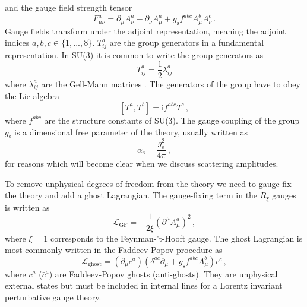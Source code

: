\documentclass[main.tex]{subfiles}
\begin{document}
    and the gauge field strength tensor
    \begin{equation}\label{eqn:F_munu}
        F^{a}_{\mu\nu} = \partial_{\mu}A^{a}_{\nu} - \partial_{\nu}A^{a}_{\mu} + g_{\mathrm{s}} f^{abc}A^{b}_{\mu}A^{c}_{\nu} \, .
    \end{equation}
    Gauge fields transform under the adjoint representation, meaning
    the adjoint indices $a,b,c \in \{1,...,8\}$. $T^{a}_{ij}$ are the
    group generators in a fundamental representation. In SU(3) it is
    common to write the group generators as
    \begin{equation}\label{eqn:group_generators}
        T^{a}_{ij} = \dfrac{1}{2}\lambda^{a}_{ij}
    \end{equation}
    where $\lambda^{a}_{ij}$ are the Gell-Mann matrices \cite{Gell-Mann:1962yej}.
    The generators of the group have to obey the Lie algebra
    \begin{equation}\label{eqn:lie_algebra}
        [T^{a}, T^{b}] = \mathrm{i}f^{abc}T^{c} \, ,
    \end{equation}
    where $f^{abc}$ are the structure constants of SU(3).
    The gauge coupling of the group $g_{\mathrm{s}}$
    is a dimensional free parameter of the theory, usually
    written as
    \begin{equation}\label{eqn:alpha_s}
        \alpha_{\mathrm{s}} = \dfrac{g_{\mathrm{s}}^{2}}{4\pi} \, ,
    \end{equation}
    for reasons which will become clear when we discuss
    scattering amplitudes.

    To remove unphysical degrees of freedom from the
    theory we need to gauge-fix the theory
    and add a ghost Lagrangian. The gauge-fixing term
    in the $R_{\xi}$ gauges is written as
    \begin{equation}\label{eqn:L_GF}
        \mathcal{L}_{\mathrm{GF}} = -\dfrac{1}{2\xi}(\partial^{\mu}A_{\mu}^{a})^{2} \, ,
    \end{equation}
    where $\xi = 1$ corresponds to the Feynman-'t-Hooft gauge.
    The ghost Lagrangian is most commonly written
    in the Faddeev-Popov procedure as
    \begin{equation}\label{eqn:L_ghost}
        \mathcal{L}_{\mathrm{ghost}} = (\partial_{\mu}\bar{c}^{a})(\delta^{ac}\partial_{\mu} + g_{\mathrm{s}}f^{abc}A^{b}_{\mu})c^{c} \, ,
    \end{equation}
    where $c^{a}$ ($\bar{c}^{a}$) are Faddeev-Popov ghosts (anti-ghosts).
    They are unphysical external states but must be
    included in internal lines for a Lorentz invariant
    perturbative gauge theory.
\end{document}
